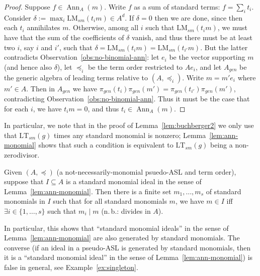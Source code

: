 \documentclass[11pt,reqno]{amsart}
\newcommand{\divides}{\mid}
\DeclareMathOperator{\Ann}{Ann}
\newcommand{\lmsm}{\text{LM}_{sm}}
\newcommand{\ltsm}{\text{LT}_{sm}}
\theoremstyle{definition}
\numberwithin{equation}{section}
\begin{document}
\begin{proof}
Suppose $f \in \Ann_A(m)$. Write $f$ as a sum of standard terms: $f = \sum_i t_i$. Consider $\delta := \max_i \lmsm(t_i m) \in A^d$. If $\delta=0$ then we are done, since then each $t_i$ annihilates $m$. Otherwise, among all $i$ such that $\lmsm(t_i m)$, we must have that the sum of the coefficients of $\delta$ vanish, and thus there must be at least two $i$, say $i$ and $i'$, such that $\delta = \lmsm(t_i m) = \lmsm(t_{i'} m)$. But the latter contradicts Observation~\ref{obs:no-binomial-ann}: let $e_i$ be the vector supporting $m$ (and hence also $\delta$), let $\preceq_i$ be the term order restricted to $Ae_i$, and let $A_{gen}$ be the generic algebra of leading terms relative to $(A,\preceq_i)$. Write $m = m' e_i$ where $m' \in A$. Then in $A_{gen}$ we have $\pi_{gen}(t_i) \pi_{gen}(m') = \pi_{gen}(t_{i'}) \pi_{gen}(m')$, contradicting Observation~\ref{obs:no-binomial-ann}. Thus it must be the case that for each $i$, we have $t_i m = 0$, and thus $t_i \in \Ann_A(m)$.
\end{proof}

In particular, we note that in the proof of Lemma~\ref{lem:buchberger2} we only use that $\ltsm(g)$ times any standard monomial is nonzero; Lemma~\ref{lem:ann-monomial} shows that such a condition is equivalent to $\ltsm(g)$ being a non-zerodivisor.

\begin{lemma} \label{lem:prep}
Given $(A,\preceq)$ (a not-necessarily-monomial psuedo-ASL and term order), suppose that $I \subseteq A$ is a standard monomial ideal in the sense of Lemma~\ref{lem:ann-monomial}. Then there is a finite set $m_1, \dotsc, m_s$ of standard monomials in $I$ such that for all standard monomials $m$, we have $m \in I$ iff $\exists i \in \{1,\dotsc,s\}$ such that $m_i \divides m$ (n.\,b.: divides in $A$).
\end{lemma}

In particular, this shows that ``standard monomial ideals'' in the sense of Lemma~\ref{lem:ann-monomial} are also generated by standard monomials. The converse (if an ideal in a pseudo-ASL is generated by standard monomials, then it is a ``standard monomial ideal'' in the sense of Lemma~\ref{lem:ann-monomial}) is false in general, see Example~\ref{ex:singleton}.
\end{document}
